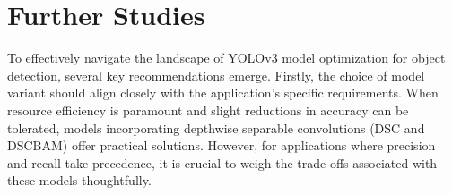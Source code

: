 \chapter{Further Studies}


To effectively navigate the landscape of YOLOv3 model optimization for object detection, several key recommendations emerge. Firstly, the choice of model variant should align closely with the application's specific requirements. When resource efficiency is paramount and slight reductions in accuracy can be tolerated, models incorporating depthwise separable convolutions (DSC and \break DSCBAM) offer practical solutions. However, for applications where precision and recall take precedence, it is crucial to weigh the trade-offs associated with these models thoughtfully.

